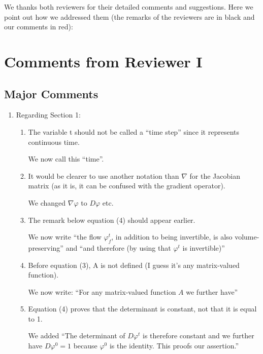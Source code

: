 \documentclass{article}
\begin{document}
We thanks both reviewers for their detailed comments and suggestions. Here we point out how we addressed them (the remarks of the reviewers are in black and our comments in {\color{mred} red}):

\section{Comments from Reviewer I}

\subsection*{Major Comments}
\begin{enumerate}
\item Regarding Section 1:
\begin{enumerate}[label=\arabic*.]
\item The variable t should not be called a ``time step'' since it represents continuous time.

    {\color{mred}We now call this ``time''}.

\item It would be clearer to use another notation than $\nabla$ for the Jacobian matrix (as it is, it can be confused with the gradient operator).

    {\color{mred}We changed $\nabla\varphi$ to $D\varphi$ etc.}

\item The remark below equation (4) should appear earlier.

    {\color{mred}We now write ``the flow $\varphi_f^t$, in addition to being invertible, is also volume-preserving'' and ``and therefore (by using that $\varphi^t$ is invertible)''}

\item Before equation (3), A is not defined (I guess it's any matrix-valued function).

    {\color{mred} We now write: ``For any matrix-valued function $A$ we further have''}

\item Equation (4) proves that the determinant is constant, not that it is equal to 1.

    {\color{mred} We added ``The determinant of $D\varphi^t$ is therefore constant and we further have $D\varphi^0 = 1$ because $\varphi^0$ is the identity. This proofs our assertion.''}

\end{enumerate}


\end{enumerate}
\end{document}

